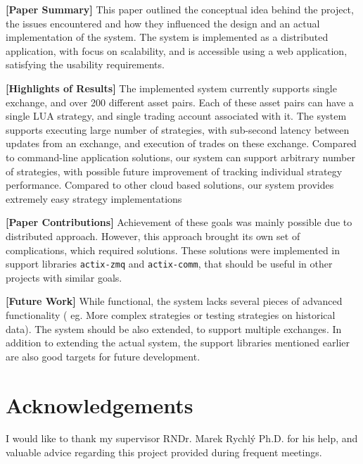 \documentclass{ExcelAtFIT}
\begin{document}
    \textbf{[Paper Summary]}
    This paper outlined the conceptual idea behind the project, the issues encountered and how they
    influenced the design and an actual implementation of the system. The system is implemented as a distributed application,
    with focus on scalability, and is accessible using a web application, satisfying the usability requirements.

    \textbf{[Highlights of Results]}
    The implemented system currently supports single exchange, and over 200 different asset pairs. Each of these
    asset pairs can have a single LUA strategy, and single trading account associated with it.
    The system supports executing large number of strategies, with sub-second latency between updates from an exchange, and
    execution of trades on these exchange. Compared to command-line application solutions, our system can support arbitrary number of
    strategies, with possible future improvement of tracking individual strategy performance. Compared to other cloud based solutions,
    our system provides extremely easy strategy implementations

    \textbf{[Paper Contributions]}
    Achievement of these goals was mainly possible due to distributed approach. However, this approach brought its own set of complications,
    which required solutions. These solutions were implemented in support libraries \verb|actix-zmq| and \verb|actix-comm|, that should
    be useful in other projects with similar goals.

    \textbf{[Future Work]}
    While functional, the system lacks several pieces of advanced functionality ( eg. More complex strategies or testing strategies on historical data).
    The system should be also extended, to support multiple exchanges. In addition to extending the actual system, the support libraries mentioned earlier
    are also good targets for future development.
    \section*{Acknowledgements}
    I would like to thank my supervisor RNDr. Marek Rychlý Ph.D. for his help, and valuable advice regarding this project provided during frequent meetings.

    
    
\end{document}
